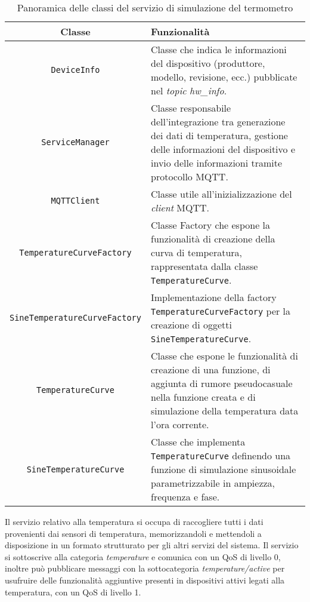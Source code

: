 \begin{table}[!h]
\caption{Panoramica delle classi del servizio di simulazione del termometro}
\label{tab:classi-termometro}
\begin{tabularx}{\linewidth}{|c|X|}
\hline
\textbf{Classe} & \textbf{Funzionalità} \\
\hline
\texttt{DeviceInfo} & Classe che indica le informazioni del dispositivo (produttore, modello, revisione, ecc.) pubblicate nel \emph{topic} \emph{hw\_info}.\\
\hline
\texttt{ServiceManager} & Classe responsabile dell'integrazione tra generazione dei dati di temperatura, gestione delle informazioni del dispositivo e invio delle informazioni tramite protocollo MQTT. \\
\hline
\texttt{MQTTClient} & Classe utile all'inizializzazione del \emph{client} MQTT. \\
\hline
\texttt{TemperatureCurveFactory} & Classe Factory che espone la funzionalità di creazione della curva di temperatura, rappresentata dalla classe \texttt{TemperatureCurve}. \\
\hline
\texttt{SineTemperatureCurveFactory} & Implementazione della factory \texttt{TemperatureCurveFactory} per la creazione di oggetti \texttt{SineTemperatureCurve}. \\
\hline
\texttt{TemperatureCurve} & Classe che espone le funzionalità di creazione di una funzione, di aggiunta di rumore pseudocasuale nella funzione creata e di simulazione della temperatura data l'ora corrente. \\
\hline
\texttt{SineTemperatureCurve} & Classe che implementa \texttt{TemperatureCurve} definendo una funzione di simulazione sinusoidale parametrizzabile in ampiezza, frequenza e fase. \\
\hline
\end{tabularx}
\end{table}

Il servizio relativo alla temperatura si occupa di raccogliere tutti i dati provenienti dai sensori di temperatura, memorizzandoli e mettendoli a disposizione in un formato strutturato per gli altri servizi del sistema.
Il servizio si sottoscrive alla categoria \emph{temperature} e comunica con un QoS di livello 0, inoltre può pubblicare messaggi con la sottocategoria \emph{temperature/active} per usufruire delle funzionalità aggiuntive presenti in dispositivi attivi legati alla temperatura, con un QoS di livello 1.

